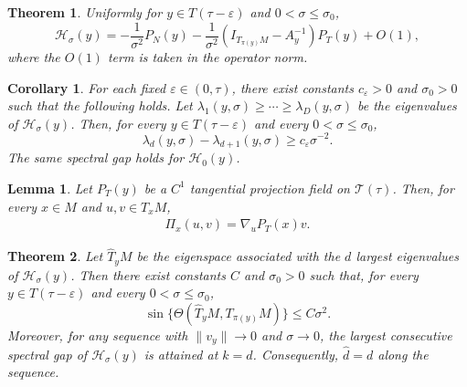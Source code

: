\documentclass[10pt,a4paper]{amsart}
\newtheorem{corollary}{Corollary}
\newtheorem{theorem}{Theorem}
\newtheorem{lemma}{Lemma}
\begin{document}
\begin{theorem}\label{th:noisy-hessian}
Uniformly for $y\in T(\tau-\varepsilon)$ and $0<\sigma\le\sigma_0$,
\[
\mathcal{H}_\sigma(y)
= - \frac{1}{\sigma^2}P_N(y)
- \frac{1}{\sigma^2}(I_{T_{\pi(y)}M} - A_y^{-1})P_T(y)
+ O(1),
\]
where the $O(1)$ term is taken in the operator norm.
\end{theorem}

\begin{corollary}\label{co:noisy-hessian-gap}
For each fixed $\varepsilon\in(0,\tau)$, there exist constants $c_\varepsilon>0$ and $\sigma_0>0$ such that the following holds. Let $\lambda_1(y,\sigma)\ge \cdots \ge \lambda_D(y,\sigma)$
be the eigenvalues of $\mathcal H_\sigma(y)$. Then, for every $y\in T(\tau-\varepsilon)$ and every $0<\sigma\le \sigma_0$,
\[
\lambda_d(y,\sigma)-\lambda_{d+1}(y,\sigma)\ge c_\varepsilon \sigma^{-2}.
\]
The same spectral gap holds for $\mathcal H_0(y)$.
\end{corollary}

\begin{lemma}\label{lem:second-fundamental-form-general}
    Let $P_T(y)$ be a $C^1$ tangential projection field on $\mathcal T(\tau)$. Then, for every $x\in M$ and $u,v\in T_xM$,
    \begin{align}
        \Pi_x(u,v) = \nabla_uP_T(x) v.
    \end{align}
\end{lemma}

\begin{theorem}\label{th:tangent-space}
Let $\widehat T_yM$ be the eigenspace associated with the $d$ largest eigenvalues of $\mathcal H_\sigma(y)$. Then there exist constants $C$ and $\sigma_0>0$ such that, for every $y\in T(\tau-\varepsilon)$ and every $0<\sigma\le\sigma_0$,
\[
\sin\{\Theta(\widehat{T}_{y}M,T_{\pi(y)}M)\} \le C\sigma^2.
\]
Moreover, for any sequence with $\|v_y\|\to0$ and $\sigma\to0$, the largest consecutive spectral gap of $\mathcal H_\sigma(y)$ is attained at $k=d$. Consequently, $\widehat d=d$ along the sequence.
\end{theorem}
\end{document}
